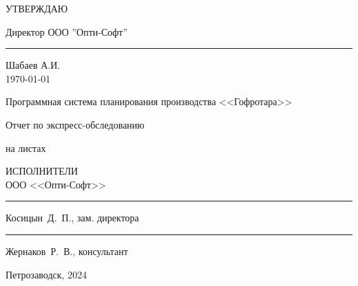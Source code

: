 


\thispagestyle{empty}
%
%
\begin{flushright}
УТВЕРЖДАЮ

\vspace{5mm}
Директор ООО ''Опти-Софт''\\
\vspace{5mm}
\rule{3cm}{0.4pt} Шабаев А.И.\\
\vspace{5mm}
\today
\end{flushright}

\vspace{3cm}
\centerline{\large Программная система планирования производства <<Гофротара>>}


\vspace{5mm}
\centerline{\large \FIRMA}

\vspace{5mm}
\centerline{\large Отчет по экспресс-обследованию}

\vspace{5mm}
\centerline{\ESKDNUM}


\vspace{5mm}
\centerline{на \pageref{LastPage} листах}


\vspace{3cm}
\begin{flushright}
ИСПОЛНИТЕЛИ\\
\vspace{3mm}
ООО <<Опти-Софт>>\\
\vspace{3mm}
\rule{4cm}{0.4pt} Косицын~Д.~П., зам. директора\\
\vspace{3mm}
\rule{4cm}{0.4pt} Жернаков~Р.~В., консультант\\
\end{flushright}




\vspace{14mm}
\centerline{Петрозаводск, 2024}



\newpage
